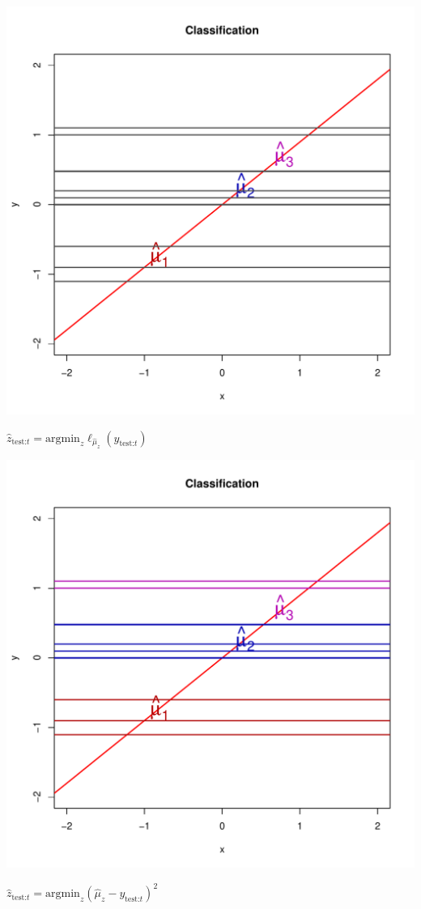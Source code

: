 \documentclass{beamer}
\begin{document}
\begin{frame}
\begin{center}
\includegraphics[scale = 0.4]{ti6.pdf}
\end{center}
$\hat{z}_{\text{test:} t} = \text{argmin}_{z} \ell_{\hat{\mu}_z}(y_{\text{test:} t})$
\end{frame}

\begin{frame}
\begin{center}
\includegraphics[scale = 0.4]{ti7.pdf}
\end{center}
$\hat{z}_{\text{test:} t} = \text{argmin}_{z} (\hat{\mu}_z -
y_{\text{test:} t})^2$
\end{frame}
\end{document}
